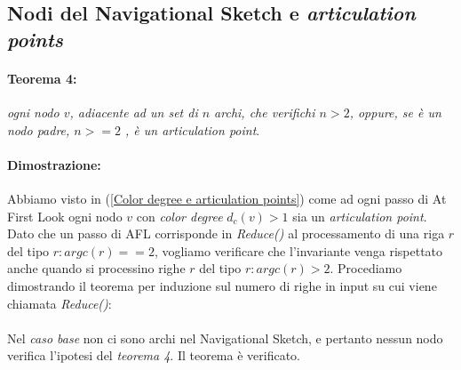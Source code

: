 \documentclass[a4paper,11pt]{report}
\begin{document}
\subsection{Nodi del Navigational Sketch e \emph{articulation points}}
\paragraph{Teorema 4:}\emph{ogni nodo $v$, adiacente ad un set di $n$ archi, che verifichi $n>2$, oppure, se è un nodo padre, $n>=2$ , è un
articulation point}.
\paragraph{Dimostrazione:} Abbiamo visto in (\ref{Color degree e articulation points}) come ad ogni passo di At First Look ogni nodo $v$ con
\emph{color degree} $d_c(v)>1$ sia un 
\emph{articulation point}. Dato che un passo di AFL corrisponde in \emph{Reduce()} al processamento di una riga $r$ del tipo
$r:argc\left(r\right)==2$, vogliamo verificare che l'invariante venga
rispettato anche quando si processino righe $r$ del tipo $r:argc\left(r\right)>2$. Procediamo dimostrando il teorema per induzione sul
numero di righe in input su cui viene chiamata \emph{Reduce()}:
\paragraph{}
Nel \emph{caso base} non ci sono archi nel Navigational Sketch, e pertanto nessun nodo verifica l'ipotesi del \emph{teorema 4}. Il teorema è
verificato.
\end{document}
